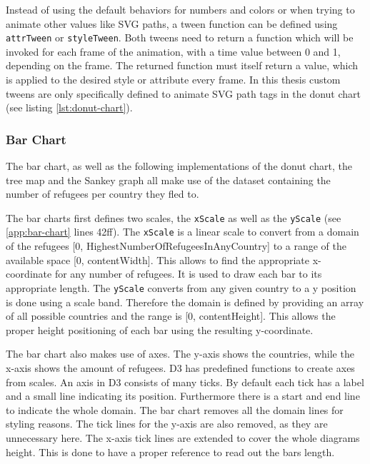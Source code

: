 Instead of using the default behaviors for numbers and colors or when trying to animate other values like SVG paths, a tween function can be defined using \verb|attrTween| or \verb|styleTween|. Both tweens need to return a function which will be invoked for each frame of the animation, with a time value between 0 and 1, depending on the frame. The returned function must itself return a value, which is applied to the desired style or attribute every frame. In this thesis custom tweens are only specifically defined to animate SVG path tags in the donut chart (see listing \ref{lst:donut-chart}).


\subsubsection{Bar Chart}
The bar chart, as well as the following implementations of the donut chart, the tree map and the Sankey graph all make use of the dataset containing the number of refugees per country they fled to.

The bar charts first defines two scales, the \texttt{xScale} as well as the \texttt{yScale} (see \ref{app:bar-chart} lines 42ff). The \texttt{xScale} is a linear scale to convert from a domain of the refugees [0, HighestNumberOfRefugeesInAnyCountry] to a range of the available space [0, contentWidth]. This allows to find the appropriate x-coordinate for any number of refugees. It is used to draw each bar to its appropriate length. The \texttt{yScale} converts from any given country to a y position is done using a scale band. Therefore the domain is defined by providing an array of all possible countries and the range is [0, contentHeight]. This allows the proper height positioning of each bar using the resulting y-coordinate.

The bar chart also makes use of axes. The y-axis shows the countries, while the x-axis shows the amount of refugees. D3 has predefined functions to create axes from scales. An axis in D3 consists of many ticks. By default each tick has a label and a small line indicating its position. Furthermore there is a start and end line to indicate the whole domain. The bar chart removes all the domain lines for styling reasons. The tick lines for the y-axis are also removed, as they are unnecessary here. The x-axis tick lines are extended to cover the whole diagrams height. This is done to have a proper reference to read out the bars length.

